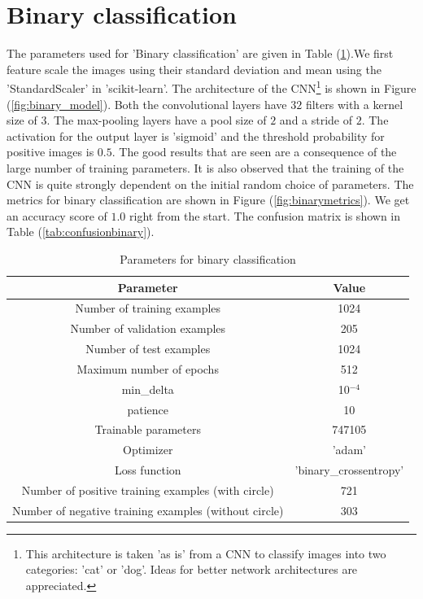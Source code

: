 \documentclass{article}
\begin{document}
\section{Binary classification}
 The parameters used for 'Binary classification' are given in Table (\ref{tab:binaryparam}).We first feature scale the images using their standard deviation and mean using the 'StandardScaler' in 'scikit-learn'. The architecture of the CNN\footnote{This architecture is taken 'as is' from a CNN to classify images into two categories: 'cat' or 'dog'. Ideas for better network architectures are appreciated.} is shown in Figure (\ref{fig:binary_model}). Both the convolutional layers have $32$ filters with a kernel size of $3$. The max-pooling layers have a pool size of $2$ and a stride of $2$. The activation for the output layer is 'sigmoid' and the threshold probability for positive images is $0.5$. The good results that are seen are a consequence of the large number of training parameters. It is also observed that the training of the CNN is quite strongly dependent on the initial random choice of parameters. The metrics for binary classification are shown in Figure (\ref{fig:binarymetrics}). We get an accuracy score of $1.0$ right from the start. The confusion matrix is shown in Table (\ref{tab:confusionbinary}). 
\begin{table}
  \centering
  \begin{tabular}{|c|c|}
    \hline
    Parameter & Value \\
    \hline
    Number of training examples   & 1024 \\
    Number of validation examples & 205 \\
    Number of test examples       & 1024 \\
    Maximum number of epochs      & 512 \\
    min{\_}delta      & 10$^{-4}$\\
    patience                      & 10  \\
    Trainable parameters          & 747105\\
    Optimizer         & 'adam'     \\
    Loss function     & 'binary\_crossentropy' \\
    Number of positive training examples (with circle) & 721\\
    Number of negative training examples (without circle) & 303\\
    \hline
  \end{tabular}
  \caption{\label{tab:binaryparam} Parameters for binary classification}
\end{table}
\end{document}
